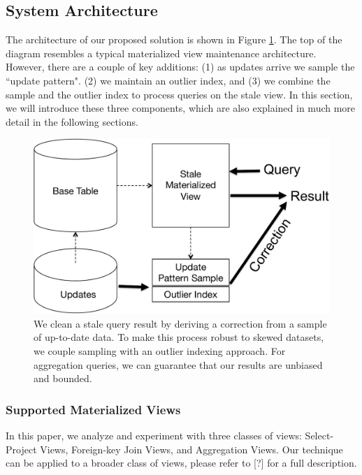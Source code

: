 \subsection{System Architecture}
The architecture of our proposed solution is shown in Figure \ref{sys-arch}.
The top of the diagram resembles a typical materialized view maintenance architecture.
However, there are a couple of key additions: (1) as updates arrive we sample the ``update pattern". 
(2) we maintain an outlier index, and (3) we combine the sample and the outlier index to process queries on the stale view.
In this section, we will introduce these three components, which are also explained in much more detail in the following sections.

\begin{figure}[h]
\centering
 \includegraphics[scale=0.35]{figs/sys-arch.pdf}
 \caption{We clean a stale query result by deriving a correction from a sample of up-to-date data. To make this process robust to skewed datasets, we couple sampling with an outlier indexing approach. For aggregation queries, we can guarantee that our results are unbiased and bounded. \label{sys-arch}}
\end{figure}

\subsubsection{Supported Materialized Views}\label{subsubsec:supported-view}
In this paper, we analyze and experiment with three classes of views: Select-Project Views, Foreign-key Join Views, and Aggregation Views.
Our technique can be applied to a broader class of views, please refer to [?] for a full description.
\vspace{1em}

